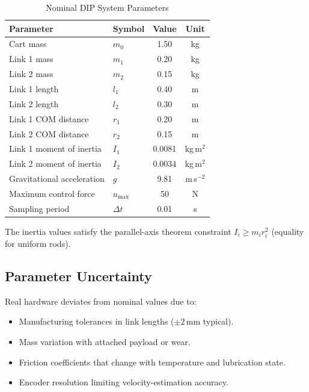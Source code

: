 \documentclass[11pt,a4paper]{article}
\begin{document}
\begin{table}[htbp]
\centering
\caption{Nominal DIP System Parameters}
\label{tab:params}
\begin{tabular}{@{}llcc@{}}
\toprule
Parameter                  & Symbol      & Value  & Unit              \\
\midrule
Cart mass                  & $m_0$       & 1.50   & kg                \\
Link 1 mass                & $m_1$       & 0.20   & kg                \\
Link 2 mass                & $m_2$       & 0.15   & kg                \\
Link 1 length              & $l_1$       & 0.40   & m                 \\
Link 2 length              & $l_2$       & 0.30   & m                 \\
Link 1 COM distance        & $r_1$       & 0.20   & m                 \\
Link 2 COM distance        & $r_2$       & 0.15   & m                 \\
Link 1 moment of inertia   & $I_1$       & 0.0081 & kg\,m$^2$         \\
Link 2 moment of inertia   & $I_2$       & 0.0034 & kg\,m$^2$         \\
Gravitational acceleration & $g$         & 9.81   & m\,s$^{-2}$       \\
Maximum control force      & $u_{\max}$  & 50     & N                 \\
Sampling period            & $\Delta t$  & 0.01   & s                 \\
\bottomrule
\end{tabular}
\end{table}

The inertia values satisfy the parallel-axis theorem constraint
$I_i \geq m_i r_i^2$ (equality for uniform rods).

\subsection{Parameter Uncertainty}

Real hardware deviates from nominal values due to:

\begin{itemize}
    \item Manufacturing tolerances in link lengths ($\pm 2\,\mathrm{mm}$ typical).
    \item Mass variation with attached payload or wear.
    \item Friction coefficients that change with temperature and lubrication state.
    \item Encoder resolution limiting velocity-estimation accuracy.
\end{itemize}
\end{document}
